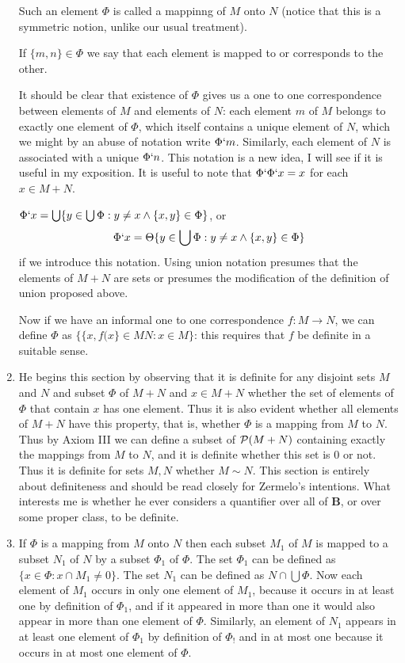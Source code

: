 \documentclass[12pt]{article}
\begin{document}
\begin{enumerate}
Such an element $\Phi$ is called a mappinng of $M$ onto $N$ (notice that this is a symmetric notion, unlike our usual treatment).

If $\{m,n\} \in \Phi$ we say that each element is mapped to or corresponds to the other.

It should be clear that existence of $\Phi$ gives us a one to one correspondence between elements of $M$ and elements of $N$:  each element $m$ of $M$ belongs to
exactly one element of $\Phi$, which itself contains a unique element of $N$, which we might by an abuse of notation write $\Phi`m$.  Similarly, each element of $N$ is associated with a unique $\Phi`n$.  This notation is a new idea, I will see if it is useful in my exposition.  It is useful to note that $\Phi`\Phi`x=x$ for each $x \in M+N$.

$\Phi`x = \bigcup \{y \in \bigcup \Phi:y \neq x \wedge \{x,y\} \in \Phi\}$, or $$\Phi`x = \Theta \{y \in \bigcup \Phi:y \neq x \wedge \{x,y\} \in \Phi\}$$ if we introduce this notation.  Using union notation presumes that the elements of $M+N$ are sets or presumes the modification of the definition of union proposed above.

Now if we have an informal one to one correspondence $f:M \rightarrow N$, we can define $\Phi$ as $\{\{x,f(x\}\in MN: x \in M\}$:  this requires that $f$ be definite in a suitable sense.

\item  He begins this section by observing that it is definite for any disjoint sets $M$ and $N$ and subset $\Phi$ of $M+N$ and $x \in M+N$ whether the set of elements of $\Phi$ that contain $x$ has one element.  Thus it is also evident whether all elements of $M+N$ have this property, that is, whether $\Phi$ is a mapping from $M$ to $N$.  Thus by Axiom III
we can define a subset of ${\cal P}(M+N)$ containing exactly the mappings from $M$ to $N$, and it is definite whether this set is 0 or not.  Thus it is definite for sets $M,N$ whether
$M \sim N$.  This section is entirely about definiteness and should be read closely for Zermelo's intentions.  What interests me is whether he ever considers a quantifier over all
of {\bf B}, or over some proper class, to be definite.

\item If $\Phi$ is a mapping from $M$ onto $N$ then each subset $M_1$ of $M$ is mapped to a subset $N_1$ of $N$ by a subset $\Phi_1$ of $\Phi$.  The set $\Phi_1$ can be defined
as $\{x \in \Phi: x \cap M_1 \neq 0\}$.   The set $N_1$ can be defined as $N \cap \bigcup \Phi$.  Now each element of $M_1$ occurs in only one element of $M_1$, because it occurs in at least one by definition of $\Phi_1$, and if it appeared in more than one it would also appear in more than one element of $\Phi$.  Similarly, an element of $N_1$ appears in at least one element of $\Phi_1$ by definition of $\Phi_!$ and in at most one because it occurs in at most one element of $\Phi$.


\end{enumerate}
\end{document}
